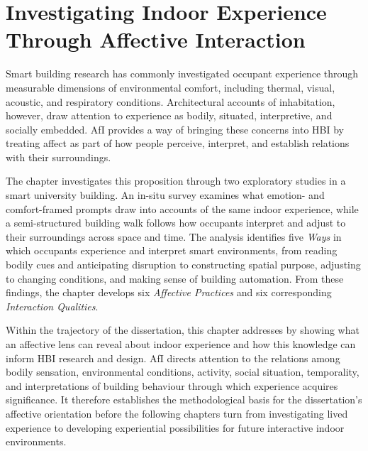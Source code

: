 
\chapter{Investigating Indoor Experience Through Affective Interaction}
\label{ch:affective-interaction}

\begin{synopsis}

Smart building research has commonly investigated occupant experience through measurable dimensions of environmental comfort, including thermal, visual, acoustic, and respiratory conditions. Architectural accounts of inhabitation, however, draw attention to experience as bodily, situated, interpretive, and socially embedded. AfI provides a way of bringing these concerns into HBI by treating affect as part of how people perceive, interpret, and establish relations with their surroundings.

The chapter investigates this proposition through two exploratory studies in a smart university building. An in-situ survey examines what emotion- and comfort-framed prompts draw into accounts of the same indoor experience, while a semi-structured building walk follows how occupants interpret and adjust to their surroundings across space and time. The analysis identifies five \emph{Ways} in which occupants experience and interpret smart environments, from reading bodily cues and anticipating disruption to constructing spatial purpose, adjusting to changing conditions, and making sense of building automation. From these findings, the chapter develops six \emph{Affective Practices} and six corresponding \emph{Interaction Qualities}.

Within the trajectory of the dissertation, this chapter addresses  by showing what an affective lens can reveal about indoor experience and how this knowledge can inform HBI research and design. AfI directs attention to the relations among bodily sensation, environmental conditions, activity, social situation, temporality, and interpretations of building behaviour through which experience acquires significance. It therefore establishes the methodological basis for the dissertation's affective orientation before the following chapters turn from investigating lived experience to developing experiential possibilities for future interactive indoor environments.
\end{synopsis}

